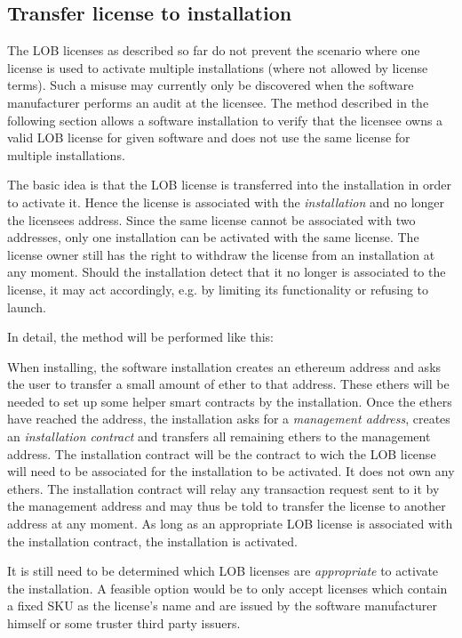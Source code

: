 \documentclass[a4paper]{article}
\begin{document}
\subsection{Transfer license to installation}

The LOB licenses as described so far do not prevent the scenario where one license is used to activate multiple installations (where not allowed by license terms). Such a misuse may currently only be discovered when the software manufacturer performs an audit at the licensee. The method described in the following section allows a software installation to verify that the licensee owns a valid LOB license for given software and does not use the same license for multiple installations.

The basic idea is that the LOB license is transferred into the installation in order to activate it. Hence the license is associated with the \emph{installation} and no longer the licensees address. Since the same license cannot be associated with two addresses, only one installation can be activated with the same license. The license owner still has the right to withdraw the license from an installation at any moment. Should the installation detect that it no longer is associated to the license, it may act accordingly, e.g. by limiting its functionality or refusing to launch.

In detail, the method will be performed like this:

When installing, the software installation creates an ethereum address and asks the user to transfer a small amount of ether to that address. These ethers will be needed to set up some helper smart contracts by the installation. Once the ethers have reached the address, the installation asks for a \emph{management address}, creates an \emph{installation contract} and transfers all remaining ethers to the management address. The installation contract will be the contract to wich the LOB license will need to be associated for the installation to be activated. It does not own any ethers. The installation contract will relay any transaction request sent to it by the management address and may thus be told to transfer the license to another address at any moment. As long as an appropriate LOB license is associated with the installation contract, the installation is activated.

It is still need to be determined which LOB licenses are \emph{appropriate} to activate the installation. A feasible option would be to only accept licenses which contain a fixed SKU as the license's name and are issued by the software manufacturer himself or some truster third party issuers.
\end{document}
